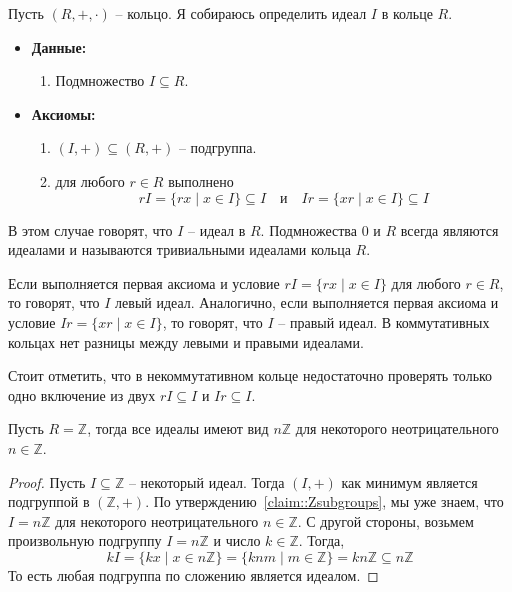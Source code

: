 \begin{definition}
Пусть $(R, +, \cdot)$ -- кольцо.
Я собираюсь определить идеал $I$ в кольце $R$.
\begin{itemize}
\item\textbf{Данные:} 
\begin{enumerate}
\item Подмножество $I\subseteq R$.
\end{enumerate}

\item\textbf{Аксиомы:}
\begin{enumerate}
\item $(I, +)\subseteq (R,+)$ -- подгруппа.

\item для любого $r\in R$ выполнено
\[
r I = \{rx\mid x\in I\} \subseteq I\quad\text{и}\quad Ir = \{xr\mid x\in I\}\subseteq I
\]
\end{enumerate}
\end{itemize}
В этом случае говорят, что $I$ -- идеал в $R$.
Подмножества $0$ и $R$ всегда являются идеалами и называются тривиальными идеалами кольца $R$.

Если выполняется первая аксиома и условие $r I = \{rx\mid x\in I\}$ для любого $r\in R$, то говорят, что $I$ левый идеал.
Аналогично, если выполняется первая аксиома и условие $ Ir = \{xr\mid x\in I\}$, то говорят, что $I$ -- правый идеал.
В коммутативных кольцах нет разницы между левыми и правыми идеалами.
\end{definition}

Стоит отметить, что в некоммутативном кольце недостаточно проверять только одно включение из двух $rI \subseteq I$ и $Ir \subseteq I$.


\begin{claim}
\label{claim::ZIdeals}
Пусть $R = \mathbb Z$, тогда все идеалы имеют вид $n\mathbb Z$ для некоторого неотрицательного $n\in \mathbb Z$.
\end{claim}
\begin{proof}
Пусть $I\subseteq \mathbb Z$ -- некоторый идеал.
Тогда $(I, +)$ как минимум является подгруппой в $(\mathbb Z, +)$.
По утверждению~\ref{claim::Zsubgroups}, мы уже знаем, что $I = n\mathbb Z$ для некоторого неотрицательного $n\in \mathbb Z$.
С другой стороны, возьмем произвольную подгруппу  $I = n\mathbb Z$ и число $k\in \mathbb Z$.
Тогда,
\[
k I = \{k x \mid x\in n\mathbb Z\} = \{kn m\mid m\in \mathbb Z\} = kn\mathbb Z\subseteq n\mathbb Z
\]
То есть любая подгруппа по сложению является идеалом.
\end{proof}


